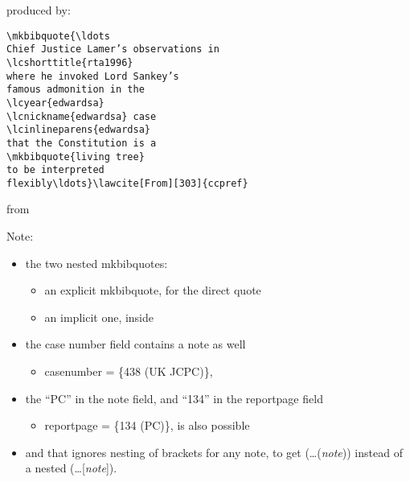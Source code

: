 \bigskip
produced by:

\bigskip
\begin{magpar}
\begin{verbatim}
\mkbibquote{\ldots 
Chief Justice Lamer’s observations in 
\lcshorttitle{rta1996} 
where he invoked Lord Sankey’s 
famous admonition in the 
\lcyear{edwardsa} 
\lcnickname{edwardsa} case 
\lcinlineparens{edwardsa} 
that the Constitution is a 
\mkbibquote{living tree} 
to be interpreted 
flexibly\ldots}\lawcite[From][303]{ccpref}
\end{verbatim}
\end{magpar}

\bigskip
from


\bigskip
Note:
\begin{itemize}
\item the two nested mkbibquotes:
\begin{itemize}
\item an explicit mkbibquote, for the direct quote
\item an implicit one, inside 
\end{itemize}
\item the case number field contains a note as well 
\begin{itemize}
\item {\ttfamily casenumber = \{438 (UK JCPC)\},}
\end{itemize}
\item the ``PC'' in the note field, and ``134'' in the reportpage field
\begin{itemize}
\item {\ttfamily reportpage = \{134 (PC)\},} is also possible
\end{itemize}
\item and that  ignores nesting of brackets for any note, to get (\ldots (\textit{note})) instead of a nested (\ldots [\textit{note}]).
\end{itemize}


